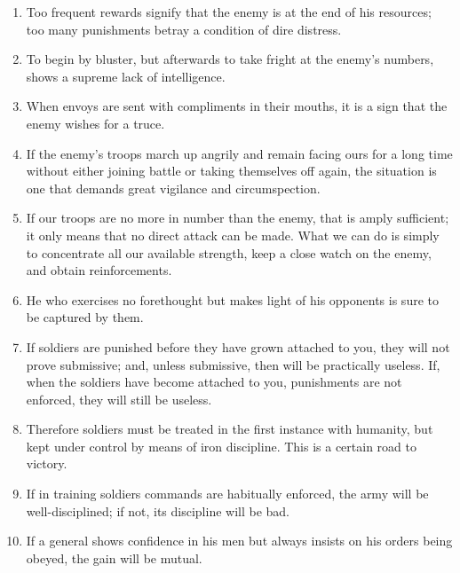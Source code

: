 \begin{enumerate}
  \item Too frequent rewards signify that the enemy is at the end of
    his resources; too many punishments betray a condition of dire
    distress.

  \item To begin by bluster, but afterwards to take fright at the
    enemy's numbers, shows a supreme lack of intelligence.

  \item When envoys are sent with compliments in their mouths, it is a
    sign that the enemy wishes for a truce.

  \item If the enemy's troops march up angrily and remain facing ours
    for a long time without either joining battle or taking themselves
    off again, the situation is one that demands great vigilance and
    circumspection.

  \item If our troops are no more in number than the enemy, that is
    amply sufficient; it only means that no direct attack can be made.
    What we can do is simply to concentrate all our available
    strength, keep a close watch on the enemy, and obtain
    reinforcements.

  \item He who exercises no forethought but makes light of his
    opponents is sure to be captured by them.

  \item If soldiers are punished before they have grown attached to
    you, they will not prove submissive; and, unless submissive, then
    will be practically useless. If, when the soldiers have become
    attached to you, punishments are not enforced, they will still be
    useless.

  \item Therefore soldiers must be treated in the first instance with
    humanity, but kept under control by means of iron discipline. This
    is a certain road to victory.

  \item If in training soldiers commands are habitually enforced, the
    army will be well-disciplined; if not, its discipline will be bad.

  \item If a general shows confidence in his men but always insists on
    his orders being obeyed, the gain will be mutual.

  \end{enumerate}


